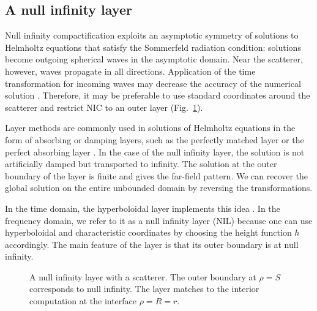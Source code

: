 \documentclass[onefignum,onetabnum]{siamart190516}
\begin{document}
\subsection{A null infinity layer}\label{sec:nil}
Null infinity compactification exploits an asymptotic symmetry of solutions to Helmholtz equations that satisfy the Sommerfeld radiation condition: solutions become outgoing spherical waves in the asymptotic domain. Near the scatterer, however, waves propagate in all directions. Application of the time transformation for incoming waves may decrease the accuracy of the numerical solution \cite{calabrese2006asymptotically}. Therefore, it may be preferable to use standard coordinates around the scatterer and restrict NIC to an outer layer (Fig.~\ref{fig:annulus}). 

Layer methods are commonly used in solutions of Helmholtz equations in the form of absorbing or damping layers, such as the perfectly matched layer \cite{BERENGER1994185} or the perfect absorbing layer \cite{wang2017perfect, yang2021truly}. In the case of the null infinity layer, the solution is not artificially damped but transported to infinity. The solution at the outer boundary of the layer is finite and gives the far-field pattern. We can recover the global solution on the entire unbounded domain by reversing the transformations. 

In the time domain, the hyperboloidal layer implements this idea \cite{ZENGINOGLU20112286}. In the frequency domain, we refer to it as a null infinity layer (NIL) because one can use hyperboloidal and characteristic coordinates by choosing the height function $h$ accordingly. The main feature of the layer is that its outer boundary is at null infinity. 

\begin{figure}[tbhp]
\centering
{}
\caption{A null infinity layer with a scatterer. The outer boundary at $\rho=S$ corresponds to null infinity. The layer matches to the interior computation at the interface $\rho=R=r$.}
\label{fig:annulus}
\end{figure}
	
\end{document}

